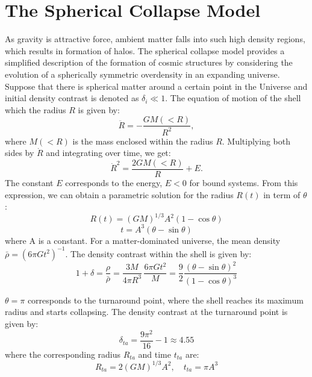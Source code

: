 \section{The Spherical Collapse Model}
As gravity is attractive force, ambient matter falls into such high density regions, which results in formation of halos. 
The spherical collapse model \citep{1972ApJ...176....1G} provides a simplified description of the formation of cosmic structures by considering the evolution of a spherically symmetric overdensity in an expanding universe. Suppose that there is spherical matter around a certain point in the Universe and initial density contrast is denoted as $\delta_i \ll 1$. The equation of motion of the shell which the radius $R$ is given by:
\begin{equation}
    \ddot{R} = -\frac{GM(<R)}{R^2},
\end{equation}
where $M(<R)$ is the mass enclosed within the radius $R$. Multiplying both sides by $\dot{R}$ and integrating over time, we get:
\begin{equation}
    \dot{R}^2 = \frac{2GM(<R)}{R} + E.
\end{equation}
The constant $E$ corresponds to the energy, $E < 0$ for bound systems. From this expression, we can obtain a parametric solution for the radius $R(t)$ in term of $\theta$:
\begin{equation}
    R(t) = (GM)^{1/3} A^2 \left(1 - \cos \theta \right)
\end{equation}
\begin{equation}
    t =  A^3 \left(\theta - \sin \theta \right)
\end{equation}
where A is a constant. For a matter-dominated universe, the mean density $\bar{\rho} = (6\pi Gt^2)^{-1}$. The density contrast within the shell is given by:
\begin{equation}
    1 + \delta = \frac{\rho}{\bar{\rho}} = \frac{3M}{4\pi R^3}\, \frac{6\pi Gt^2}{M} = \frac{9}{2} \frac{\left(\theta - \sin \theta \right)^2}{\left(1 - \cos \theta \right)^3} 
\end{equation}

$\theta = \pi$ corresponds to the turnaround point, where the shell reaches its maximum radius and starts collapsing. The density contrast at the turnaround point is given by:
\begin{equation}
    \delta_{ta} = \frac{9\pi^2}{16} - 1 \approx 4.55 
\end{equation}
where the corresponding radius $R_{ta}$ and time $t_{ta}$ are:
\begin{equation}
    R_{ta} =  2(GM)^{1/3}A^2, \quad t_{ta} = \pi A^3
\end{equation}

